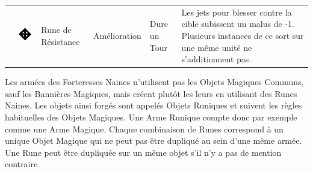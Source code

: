 \begin{tabular}{@{}c@{}c@{\hskip 8pt}>{\raggedright}m{3.3cm}M{2.1cm}M{2.1cm}m{7.4cm}@{}}
\Z{} & \includegraphics[valign=m, width=\runewidth]{pics/battlerune_resilience.png} &
Rune de Résistance &
Amélioration &
Dure un Tour &
Les jets pour blesser contre la cible subissent un malus de -1. Plusieurs instances de ce sort sur une même unité ne s'additionnent pas.
\tabularnewline

\end{tabular}

\closearmynewsection




\subtitle{}

Les armées des Forteresses Naines n'utilisent pas les Objets Magiques Communs, sauf les Bannières Magiques, mais créent plutôt les leurs en utilisant des Runes Naines. Les objets ainsi forgés sont appelés Objets Runiques et suivent les règles habituelles des Objets Magiques. Une Arme Runique compte donc par exemple comme une Arme Magique. Chaque combinaison de Runes correspond à un unique Objet Magique qui ne peut pas être dupliqué au sein d'une même armée. Une Rune peut être dupliquée sur un même objet s'il n'y a pas de mention contraire.

